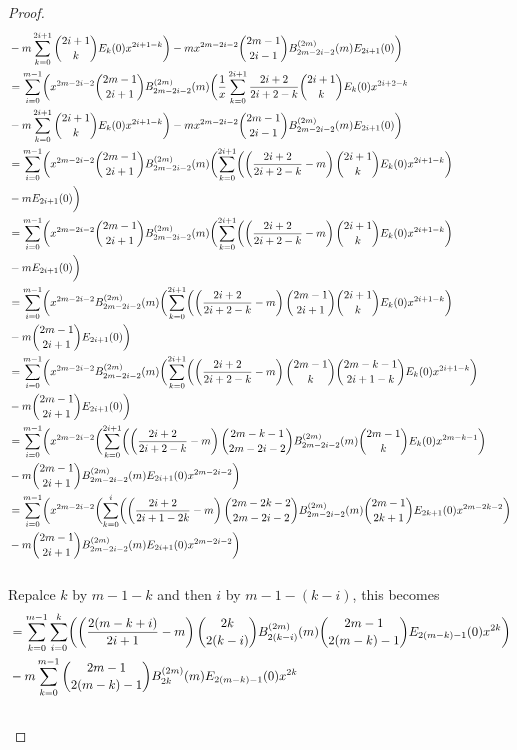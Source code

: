 \documentclass[fleqn,a4paper,9pt]{article}
\begin{document}
\begin{flushleft}
\begin{proof}
\begin{align}
&-m \sum_{k=0}^{2i+1}\binom{2i+1}{k}E_{k}(0)x^{2i+1-k}\biggr)-m x^{2m-2i-2}\binom{2m-1}{2i-1}B_{2m-2i-2}^{(2m)}(m)E_{2i+1}(0)\biggr)\\\notag
&=\sum_{i=0}^{m-1}\biggl(x^{2m-2i-2}\binom{2m-1}{2i+1}B_{2m-2i-2}^{(2m)}(m)\biggl(\frac{1}{x}\sum_{k=0}^{2i+1}\frac{2i+2}{2i+2-k}\binom{2i+1}{k}E_k(0)x^{2i+2-k}\\\notag
&-m \sum_{k=0}^{2i+1}\binom{2i+1}{k}E_{k}(0)x^{2i+1-k}\biggr)-m x^{2m-2i-2}\binom{2m-1}{2i-1}B_{2m-2i-2}^{(2m)}(m)E_{2i+1}(0)\biggr)\\\notag
&=\sum_{i=0}^{m-1}\biggl(x^{2m-2i-2}\binom{2m-1}{2i+1}B_{2m-2i-2}^{(2m)}(m)\biggl(\sum_{k=0}^{2i+1}\biggl(\left(\frac{2i+2}{2i+2-k}-m\right)\binom{2i+1}{k}E_k(0)x^{2i+1-k}\biggr)\\\notag
&-m E_{2i+1}(0)\biggr)\\\notag
&=\sum_{i=0}^{m-1}\biggl(x^{2m-2i-2}\binom{2m-1}{2i+1}B_{2m-2i-2}^{(2m)}(m)\biggl(\sum_{k=0}^{2i+1}\biggl(\left(\frac{2i+2}{2i+2-k}-m\right)\binom{2i+1}{k}E_k(0)x^{2i+1-k}\biggr)\\\notag
&-m E_{2i+1}(0)\biggr)\\\notag
&=\sum_{i=0}^{m-1}\biggl(x^{2m-2i-2}B_{2m-2i-2}^{(2m)}(m)\biggl(\sum_{k=0}^{2i+1}\biggl(\left(\frac{2i+2}{2i+2-k}-m\right)\binom{2m-1}{2i+1}\binom{2i+1}{k}E_k(0)x^{2i+1-k}\biggr)\\\notag
&-m\binom{2m-1}{2i+1} E_{2i+1}(0)\biggr)\\\notag
&=\sum_{i=0}^{m-1}\biggl(x^{2m-2i-2}B_{2m-2i-2}^{(2m)}(m)\biggl(\sum_{k=0}^{2i+1}\biggl(\left(\frac{2i+2}{2i+2-k}-m\right)\binom{2m-1}{k}\binom{2m-k-1}{2i+1-k}E_k(0)x^{2i+1-k}\biggr)\\\notag
&-m\binom{2m-1}{2i+1} E_{2i+1}(0)\biggr)\\\notag
&=\sum_{i=0}^{m-1}\biggl(x^{2m-2i-2}\biggl(\sum_{k=0}^{2i+1}\biggl(\left(\frac{2i+2}{2i+2-k}-m\right)\binom{2m-k-1}{2m-2i-2}B_{2m-2i-2}^{(2m)}(m)\binom{2m-1}{k}E_k(0)x^{2m-k-1}\biggr)\\\notag
&-m \binom{2m-1}{2i+1}B_{2m-2i-2}^{(2m)}(m)E_{2i+1}(0)x^{2m-2i-2}\biggr)\\\notag
&=\sum_{i=0}^{m-1}\biggl(x^{2m-2i-2}\biggl(\sum_{k=0}^{i}\biggl(\left(\frac{2i+2}{2i+1-2k}-m\right)\binom{2m-2k-2}{2m-2i-2}B_{2m-2i-2}^{(2m)}(m)\binom{2m-1}{2k+1}E_{2k+1}(0)x^{2m-2k-2}\biggr)\\\notag
&-m \binom{2m-1}{2i+1}B_{2m-2i-2}^{(2m)}(m)E_{2i+1}(0)x^{2m-2i-2}\biggr)\\\notag
\end{align}
Repalce $k$ by $m-1-k$ and then $i$ by $m-1-(k-i)$, this becomes
\begin{align}
&=\sum_{k=0}^{m-1}\sum_{i=0}^{k}\biggl(\left(\frac{2(m-k+i)}{2i+1}-m\right)\binom{2k}{2(k-i)}B_{2(k-i)}^{(2m)}(m)\binom{2m-1}{2(m-k)-1}E_{2(m-k)-1}(0)x^{2k}\biggr)\\\notag
&-m\sum_{k=0}^{m-1} \binom{2m-1}{2(m-k)-1}B_{2k}^{(2m)}(m)E_{2(m-k)-1}(0)x^{2k}\\\notag
\end{align}


\end{proof}
\end{flushleft}
\end{document}
